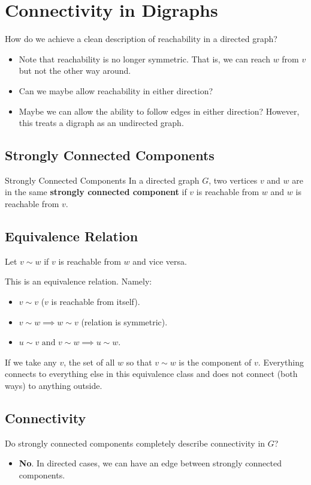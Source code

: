 \documentclass[letterpaper]{article}
\begin{document}
\section{Connectivity in Digraphs}
How do we achieve a clean description of reachability in a directed graph? 
\begin{itemize}
    \item Note that reachability is no longer symmetric. That is, we can reach $w$ from $v$ but not the other way around. 
    \item Can we maybe allow reachability in either direction?
    \item Maybe we can allow the ability to follow edges in either direction? However, this treats a digraph as an undirected graph. 
\end{itemize}

\subsection{Strongly Connected Components}
\begin{definition}{Strongly Connected Components}{}
    In a directed graph $G$, two vertices $v$ and $w$ are in the same \textbf{strongly connected component} if $v$ is reachable from $w$ and $w$ is reachable from $v$.
\end{definition}

\subsection{Equivalence Relation}
Let $v \sim w$ if $v$ is reachable from $w$ and vice versa.
\begin{proposition}
    This is an equivalence relation. Namely:
    \begin{itemize}
        \item $v \sim v$ ($v$ is reachable from itself).
        \item $v \sim w \implies w \sim v$ (relation is symmetric).
        \item $u \sim v \text{ and } v \sim w \implies u \sim w$.
    \end{itemize}
\end{proposition}
If we take any $v$, the set of all $w$ so that $v \sim w$ is the component of $v$. Everything connects to everything else in this equivalence class and does not connect (both ways) to anything outside. 

\subsection{Connectivity}
Do strongly connected components completely describe connectivity in $G$?
\begin{itemize}
    \item \textbf{No}. In directed cases, we can have an edge between strongly connected components.
\end{itemize}
\end{document}
